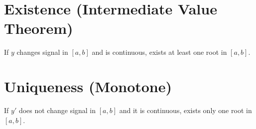 \section{Existence (Intermediate Value Theorem)}

\noindent If $y$ changes signal in $[a,b]$ and is continuous, exists at least one root in $[a,b]$.

\section{Uniqueness (Monotone)}

\noindent If $y'$ does not change signal in $[a,b]$ and it is continuous, exists only one root in $[a,b]$.